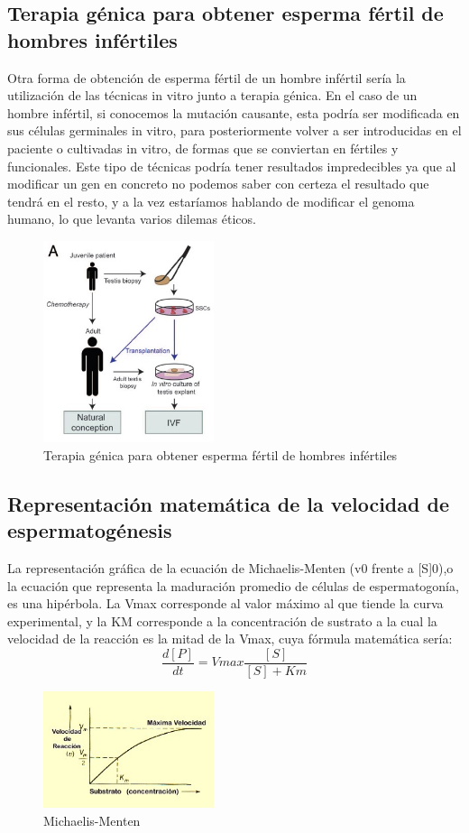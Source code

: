 \documentclass[a4paper,11pt]{article}
\begin{document}
\subsection{Terapia génica para obtener esperma fértil de hombres infértiles}
Otra forma de obtención de esperma fértil de un hombre infértil sería la utilización de las técnicas in vitro junto a terapia génica. En el caso de un hombre infértil, si conocemos la mutación causante, esta podría ser modificada en sus células germinales in vitro, para posteriormente volver a ser introducidas en el paciente o cultivadas in vitro, de formas que se conviertan en fértiles y funcionales. 
Este tipo de técnicas podría tener resultados impredecibles ya que al modificar un gen en concreto no podemos saber con certeza el resultado que tendrá en el resto, y a la vez estaríamos hablando de modificar el genoma humano, lo que levanta varios dilemas éticos. 
\begin{figure}[htb!] 
    \caption{Terapia génica para obtener esperma fértil de hombres infértiles}
    \centering 
    \includegraphics[width=5cm]{cancer-prepuber.jpg}
\end{figure}
\subsection{Representación matemática de la velocidad de espermatogénesis}
La representación gráfica de la ecuación de Michaelis-Menten (v0 frente a [S]0),o la ecuación que representa la maduración promedio de células de espermatogonía, es una hipérbola. La Vmax corresponde al valor máximo al que tiende la curva experimental, y la KM corresponde a la concentración de sustrato a la cual la velocidad de la reacción es la mitad de la Vmax, cuya fórmula matemática sería:\\
$$\frac{d[P]}{dt}=Vmax\frac{[S]}{[S]+Km}$$
\begin{figure}[htb!] 
    \caption{Michaelis-Menten}
    \centering 
    \includegraphics[width=5cm]{grafica.jpg}
\end{figure}
\cite{Bruel2020433}
\cite{Nachmanson2020}
\cite{Roveto2021}
\cite{Shigemizu2020}


\end{document}
